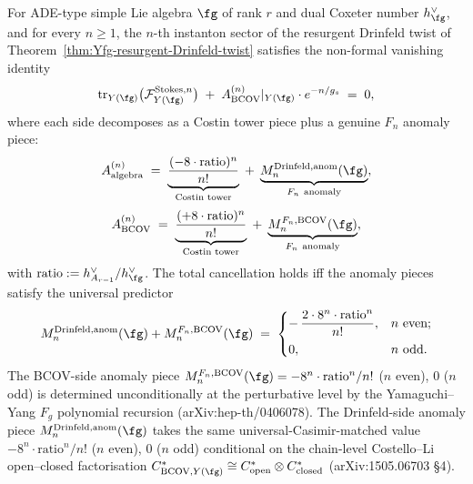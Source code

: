 \begin{conjecture}
\label{conj:Yfg-non-formal-vanishing-higher}
\ClaimStatusConjectured
For ADE-type simple Lie algebra $\fg$ of rank $r$ and dual Coxeter
number $h^\vee_\fg$, and for every $n \geq 1$, the $n$-th instanton
sector of the resurgent Drinfeld twist of
Theorem~\ref{thm:Yfg-resurgent-Drinfeld-twist} satisfies the
non-formal vanishing identity
\[
 \mathrm{tr}_{Y(\fg)}\bigl(\mathcal{F}^{\mathrm{Stokes}, n}_{Y(\fg)}\bigr)
 \;+\;
 A^{(n)}_{\mathrm{BCOV}}|_{Y(\fg)} \cdot e^{-n/g_s}
 \;=\;
 0,
\]
where each side decomposes as a Costin tower piece plus a genuine $F_n$
anomaly piece:
\[
 A^{(n)}_{\mathrm{algebra}}
 \;=\;
 \underbrace{\frac{(-8 \cdot \mathrm{ratio})^n}{n!}}_{\text{Costin tower}}
 \;+\;
 \underbrace{M^{\mathrm{Drinfeld}, \mathrm{anom}}_n(\fg)}_{F_n\ \text{anomaly}},
\]
\[
 A^{(n)}_{\mathrm{BCOV}}
 \;=\;
 \underbrace{\frac{(+8 \cdot \mathrm{ratio})^n}{n!}}_{\text{Costin tower}}
 \;+\;
 \underbrace{M^{F_n, \mathrm{BCOV}}_n(\fg)}_{F_n\ \text{anomaly}},
\]
with $\mathrm{ratio} := h^\vee_{A_{r - 1}} / h^\vee_\fg$. The total
cancellation holds iff the anomaly pieces satisfy the universal predictor
\[
 M^{\mathrm{Drinfeld}, \mathrm{anom}}_n(\fg)
 + M^{F_n, \mathrm{BCOV}}_n(\fg)
 \;=\;
 \begin{cases}
 -\,\dfrac{2 \cdot 8^n \cdot \mathrm{ratio}^n}{n!},
 & n\ \text{even};
 \\[1.5ex]
 0, & n\ \text{odd}.
 \end{cases}
\]
The BCOV-side anomaly piece $M^{F_n, \mathrm{BCOV}}_n(\fg) = -8^n \cdot
\mathrm{ratio}^n / n!$ \textup{(}$n$ even\textup{)}, $0$ \textup{(}$n$
odd\textup{)} is determined unconditionally at the perturbative level
by the Yamaguchi--Yang $F_g$ polynomial recursion
\textup{(}arXiv:hep-th/0406078\textup{).} The Drinfeld-side anomaly
piece $M^{\mathrm{Drinfeld}, \mathrm{anom}}_n(\fg)$ takes the same
universal-Casimir-matched value $-8^n \cdot \mathrm{ratio}^n / n!$
\textup{(}$n$ even\textup{)}, $0$ \textup{(}$n$ odd\textup{)} conditional
on the chain-level Costello--Li open--closed factorisation
$C^*_{\mathrm{BCOV}, Y(\fg)} \cong C^*_{\mathrm{open}} \otimes
C^*_{\mathrm{closed}}$ \textup{(}arXiv:1505.06703 \S 4\textup{).}
\end{conjecture}

